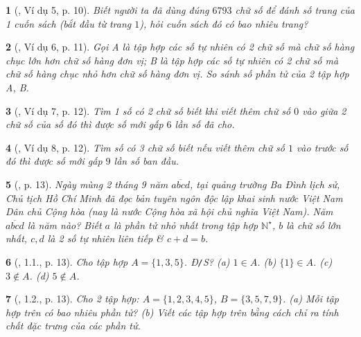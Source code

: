 \documentclass{article}
\newtheorem{baitoan}{}
\begin{document}
\begin{baitoan}[\cite{Binh_boi_duong_Toan_6_tap_1}, Ví dụ 5, p. 10]
	Biết người ta đã dùng đúng $6793$ chữ số để đánh số trang của 1 cuốn sách (bắt đầu từ trang $1$), hỏi cuốn sách đó có bao nhiêu trang?
\end{baitoan}

\begin{baitoan}[\cite{Binh_boi_duong_Toan_6_tap_1}, Ví dụ 6, p. 11]
	Gọi A là tập hợp các số tự nhiên có 2 chữ số mà chữ số hàng chục lớn hơn chữ số hàng đơn vị; B là tập hợp các số tự nhiên có 2 chữ số mà chữ số hàng chục nhỏ hơn chữ số hàng đơn vị. So sánh số phần tử của 2 tập hợp A, B.
\end{baitoan}

\begin{baitoan}[\cite{Binh_boi_duong_Toan_6_tap_1}, Ví dụ 7, p. 12]
	Tìm 1 số có 2 chữ số biết khi viết thêm chữ số $0$ vào giữa 2 chữ số của số đó thì được số mới gấp $6$ lần số đã cho.
\end{baitoan}

\begin{baitoan}[\cite{Binh_boi_duong_Toan_6_tap_1}, Ví dụ 8, p. 12]
	Tìm số có 3 chữ số biết nếu viết thêm chữ số $1$ vào trước số đó thì được số mới gấp $9$ lần số ban đầu.	
\end{baitoan}

\begin{baitoan}[\cite{Binh_boi_duong_Toan_6_tap_1}, p. 13]
	Ngày mùng 2 tháng 9 năm $\overline{abcd}$, tại quảng trường Ba Đình lịch sử, Chủ tịch Hồ Chí Minh đã đọc bản tuyên ngôn độc lập khai sinh nước Việt Nam Dân chủ Cộng hòa (nay là nước Cộng hòa xã hội chủ nghĩa Việt Nam). Năm $\overline{abcd}$ là năm nào? Biết $a$ là phần tử nhỏ nhất trong tập hợp $ \mathbb{N}^\star$, $b$ là chữ số lớn nhất, $c,d$ là 2 số tự nhiên liên tiếp \& $c + d = b$.
\end{baitoan}

\begin{baitoan}[\cite{Binh_boi_duong_Toan_6_tap_1}, 1.1., p. 13]
	Cho tập hợp $A = \{1,3,5\}$. {\rm Đ{\tt/}S?} (a) $1\in A$. (b) $\{1\}\in A$. (c) $3\notin A$. (d) $5\notin A$.
\end{baitoan}

\begin{baitoan}[\cite{Binh_boi_duong_Toan_6_tap_1}, 1.2., p. 13]
	Cho 2 tập hợp: $A = \{1,2,3,4,5\}$, $B = \{3,5,7,9\}$. (a) Mỗi tập hợp trên có bao nhiêu phần tử? (b) Viết các tập hợp trên bằng cách chỉ ra tính chất đặc trưng của các phần tử.
\end{baitoan}
\end{document}
